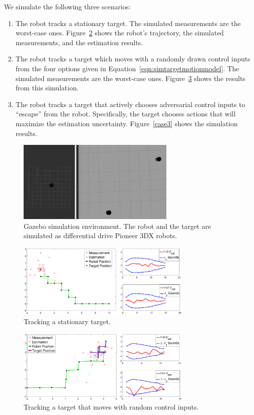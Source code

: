 \documentclass[journal]{IEEEtran}
\begin{document}
We simulate the following three scenarios:
\begin{enumerate}
\item The robot tracks a stationary target. The simulated measurements are the worst-case ones. Figure~\ref{online1} shows the robot's trajectory, the simulated measurements, and the estimation results.
\item The robot tracks a target which moves with a randomly drawn control inputs from the four options given in Equation~\ref{eqn:simtargetmotionmodel}. The simulated measurements are the worst-case ones. Figure~\ref{online2} shows the results from this simulation.
\item The robot tracks a target that actively chooses adversarial control inputs to ``escape'' from the robot. Specifically, the target chooses actions that will maximize the estimation uncertainty. Figure~\ref{case3} shows the simulation results.
\end{enumerate}


\begin{figure}
  \centering
  \includegraphics[height=4cm]{figs/simulation_environment_.png}
  \caption{Gazebo simulation environment. The robot and the target are simulated as differential drive Pioneer 3DX robots.}
  \label{Gazebo}
\end{figure}

\begin{figure}[H]
  \centering
  \includegraphics[width=8.5cm]{figs/3_stationary.eps}
  \caption{Tracking a stationary target.}
  \label{online1}
\end{figure}

\begin{figure}[H]
  \centering
  \includegraphics[width=8.5cm]{figs/2_random_walk.eps}
  \caption{Tracking a target that moves with random control inputs.}
  \label{online2}
\end{figure}
\end{document}

